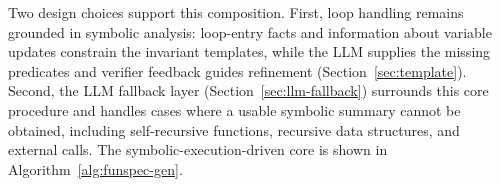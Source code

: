   {Two design choices support this composition. First, loop handling remains grounded in symbolic analysis: loop-entry facts and information about variable updates constrain the invariant templates, while the LLM supplies the missing predicates and verifier feedback guides refinement (Section~\ref{sec:template}). Second, the LLM fallback layer (Section~\ref{sec:llm-fallback}) surrounds this core procedure and handles cases where a usable symbolic summary cannot be obtained, including self-recursive functions, recursive data structures, and external calls. The symbolic-execution-driven core is shown in Algorithm~\ref{alg:funspec-gen}.}
